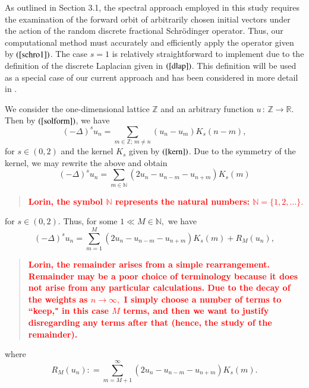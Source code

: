 \documentclass[final,1p,times]{elsarticle}
\def\NN{\mathbb N} %
\def\ZZ{\mathbb Z} %
\def\RR{\mathbb R} %
\newcommand{\bb}[1]{\begin{equation}\label{#1}}
\newcommand{\ee}{\end{equation}}
\def\R#1{$(\ref{#1})$}
\theoremstyle{remark}
\theoremstyle{definition}
\newcommand{\josh}[1]{\textcolor{red}{\textbf{#1}}}
\begin{document}


As outlined in Section 3.1, the spectral approach employed in this study requires the examination of the forward orbit of arbitrarily chosen initial vectors under the action of the random discrete fractional Schr{\"o}dinger operator. Thus, our computational method must accurately and efficiently apply the operator given by \R{schro1}. The case $s=1$ is relatively straightforward to implement due to the definition of the discrete Laplacian given in \R{dlap}. This definition will be used as a special case of our current approach and has been considered in more detail in \cite{Liaw2013,PhysRevB.96.235408,kostadinova2018transport}. 

We consider the one-dimensional lattice $\ZZ$ and an arbitrary function $u\,:\,\ZZ\to \RR.$ Then by \R{solform}, we have
$$(-\Delta)^s u_n = \sum_{m\in\ZZ;\,m\neq n} (u_n-u_m)K_s(n-m),$$
for $s\in(0,2)$ and the kernel $K_s$ given by \R{kern}. Due to the symmetry of the kernel, we may rewrite the above and obtain
\bb{comp1}
(-\Delta)^s u_n = \sum_{m\in\NN} (2u_n-u_{n-m}-u_{n+m})K_s(m)
\ee
\begin{quote}
\josh{Lorin, the symbol $\NN$ represents the natural numbers: $\NN = \{1,2,...\}.$}
\end{quote}
for $s\in(0,2).$ 
Thus, for some $1 \ll M\in\NN,$ we have
\bb{comp2}
(-\Delta)^s u_n = \sum_{m=1}^M (2u_n-u_{n-m}-u_{n+m})K_s(m) + R_M(u_n),
\ee
\begin{quote}
\josh{Lorin, the remainder arises from a simple rearrangement. Remainder may be a poor choice of terminology because it does not arise from any particular calculations. Due to the decay of the weights as $n\to\infty,$ I simply choose a number of terms to ``keep," in this case $M$ terms, and then we want to justify disregarding any terms after that (hence, the study of the remainder).}
\end{quote}
where
\bb{comp3}
R_M(u_n) \mathrel{\mathop:}= \sum_{m=M+1}^\infty (2u_n-u_{n-m}-u_{n+m})K_s(m).
\ee
\end{document}
